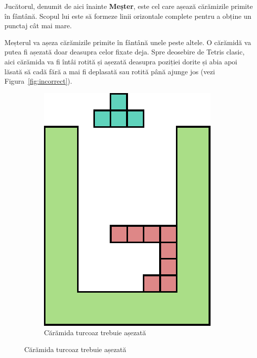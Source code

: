\documentclass[12pt]{article}
\begin{document}
Jucătorul, denumit de aici înainte \textbf{Meșter}, este cel care
așează cărămizile primite în fântână. Scopul lui este să formeze linii
orizontale complete pentru a obține un punctaj cât mai mare.

Meșterul va așeza cărămizile primite în fântână unele peste altele. O
cărămidă va putea fi așezată doar deasupra celor fixate deja. Spre
deosebire de Tetris clasic, aici cărămida va fi întâi rotită și
așezată deasupra poziției dorite și abia apoi lăsată să cadă fără a
mai fi deplasată sau rotită până ajunge jos (vezi
Figura~\ref{fig:incorrect}).

\begin{figure}[h!]
        \centering
        \begin{subfigure}[t]{0.25\textwidth}
                \includegraphics[width=\textwidth]{graphics/placenewA.pdf}
                \caption{Cărămida turcoaz trebuie așezată}
                \label{fig:incorrectA}

\end{subfigure}
\end{figure}
\end{document}
